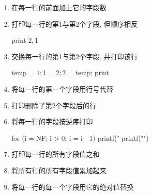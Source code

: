 \begin{enumerate}
\item 在每一行的前面加上它的字段数
\item 打印每一行的第1与第2个字段, 但顺序相反
\begin{awkcode}
    { print $2, $1 }
\end{awkcode}
\item 交换每一行的第1与第2个字段, 并打印该行
\begin{awkcode}
    { temp = $1; $1 = $2; $2 = temp; print }
\end{awkcode}
\item 将每一行的第一个字段用行号代替
\item 打印删除了第2个字段后的行
\item 将每一行的字段按逆序打印
\begin{awkcode}
    { for (i = NF; i > 0; i = i - 1) printf("%
      printf("\n")
    }
\end{awkcode}
\item 打印每一行的所有字段值之和
\item 将所有行的所有字段值累加起来
\item 将每一行的每一个字段用它的绝对值替换
\end{enumerate}
